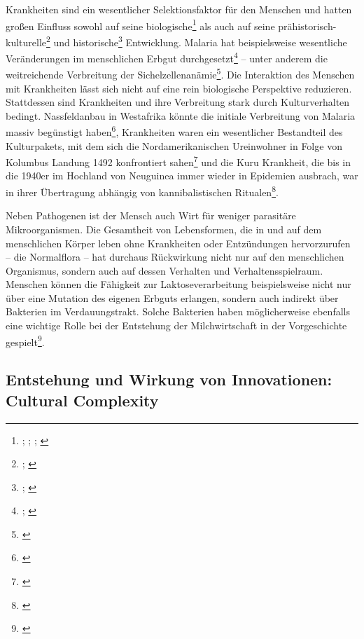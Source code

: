 \documentclass[openany,twoside,twocolumn]{book}
\let\rmarkdownfootnote\footnote%
\def\footnote{\protect\rmarkdownfootnote}
\begin{document}
Krankheiten sind ein wesentlicher Selektionsfaktor für den Menschen und
hatten großen Einfluss sowohl auf seine biologische\footnote{\textcite{bustamante_natural_2005};
  \textcite{enard_viruses_2016}; \textcite{mead_balancing_2003};
  \textcite{sabeti_genome-wide_2007}} als auch auf seine
prähistorisch-kulturelle\footnote{\textcite{martin_health_2002};
  \textcite{oxenham_skeletal_2005}} und historische\footnote{\textcite{alfani_plague_2013};
  \textcite{murray_estimation_2006}} Entwicklung. Malaria hat
beispielsweise wesentliche Veränderungen im menschlichen Erbgut
durchgesetzt\footnote{\textcite{kwiatkowski_how_2005};
  \textcite{tishkoff_haplotype_2001}} -- unter anderem die weitreichende
Verbreitung der Sichelzellenanämie\footnote{\textcite{allison_protection_1954}}.
Die Interaktion des Menschen mit Krankheiten lässt sich nicht auf eine
rein biologische Perspektive reduzieren. Stattdessen sind Krankheiten
und ihre Verbreitung stark durch Kulturverhalten bedingt. Nassfeldanbau
in Westafrika könnte die initiale Verbreitung von Malaria massiv
begünstigt haben\footnote{\textcite{durham_coevolution_1991-1}},
Krankheiten waren ein wesentlicher Bestandteil des Kulturpakets, mit dem
sich die Nordamerikanischen Ureinwohner in Folge von Kolumbus Landung
1492 konfrontiert sahen\footnote{\textcite{nunn_columbian_2010}} und die
Kuru Krankheit, die bis in die 1940er im Hochland von Neuguinea immer
wieder in Epidemien ausbrach, war in ihrer Übertragung abhängig von
kannibalistischen Ritualen\footnote{\textcite{lindenbaum_kuru_2015}}.

Neben Pathogenen ist der Mensch auch Wirt für weniger parasitäre
Mikroorganismen. Die Gesamtheit von Lebensformen, die in und auf dem
menschlichen Körper leben ohne Krankheiten oder Entzündungen
hervorzurufen -- die Normalflora -- hat durchaus Rückwirkung nicht nur
auf den menschlichen Organismus, sondern auch auf dessen Verhalten und
Verhaltensspielraum. Menschen können die Fähigkeit zur
Laktoseverarbeitung beispielsweise nicht nur über eine Mutation des
eigenen Erbguts erlangen, sondern auch indirekt über Bakterien im
Verdauungstrakt. Solche Bakterien haben möglicherweise ebenfalls eine
wichtige Rolle bei der Entstehung der Milchwirtschaft in der
Vorgeschichte gespielt\footnote{\textcite{walter_human_2011}}.

\hypertarget{cultural-complexity}{%
\subsection{Entstehung und Wirkung von Innovationen: Cultural
Complexity}\label{cultural-complexity}}
\end{document}
